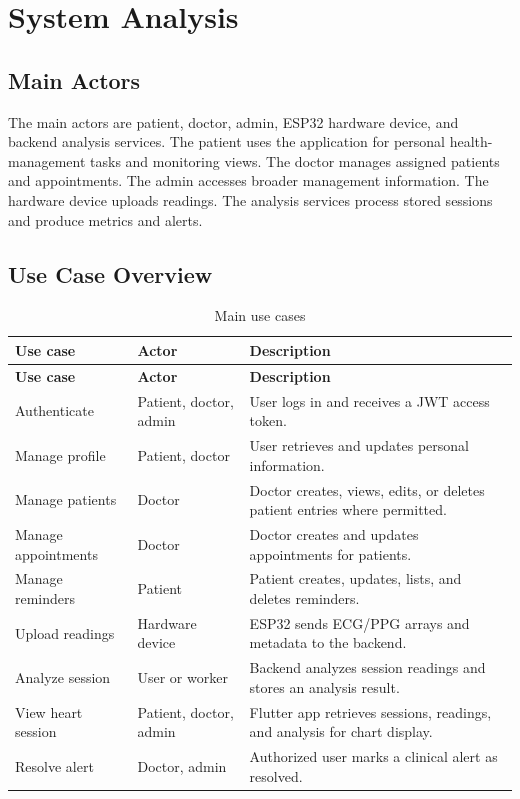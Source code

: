 \chapter{System Analysis}

\section{Main Actors}

The main actors are patient, doctor, admin, ESP32 hardware device, and backend analysis services. The patient uses the application for personal health-management tasks and monitoring views. The doctor manages assigned patients and appointments. The admin accesses broader management information. The hardware device uploads readings. The analysis services process stored sessions and produce metrics and alerts.

\section{Use Case Overview}

\begin{longtable}{p{} p{} p{}}
\caption{Main use cases}\\
\toprule
\textbf{Use case} & \textbf{Actor} & \textbf{Description}\\
\midrule
\endfirsthead
\toprule
\textbf{Use case} & \textbf{Actor} & \textbf{Description}\\
\midrule
\endhead
Authenticate & Patient, doctor, admin & User logs in and receives a JWT access token.\\
Manage profile & Patient, doctor & User retrieves and updates personal information.\\
Manage patients & Doctor & Doctor creates, views, edits, or deletes patient entries where permitted.\\
Manage appointments & Doctor & Doctor creates and updates appointments for patients.\\
Manage reminders & Patient & Patient creates, updates, lists, and deletes reminders.\\
Upload readings & Hardware device & ESP32 sends ECG/PPG arrays and metadata to the backend.\\
Analyze session & User or worker & Backend analyzes session readings and stores an analysis result.\\
View heart session & Patient, doctor, admin & Flutter app retrieves sessions, readings, and analysis for chart display.\\
Resolve alert & Doctor, admin & Authorized user marks a clinical alert as resolved.\\
\bottomrule
\end{longtable}

